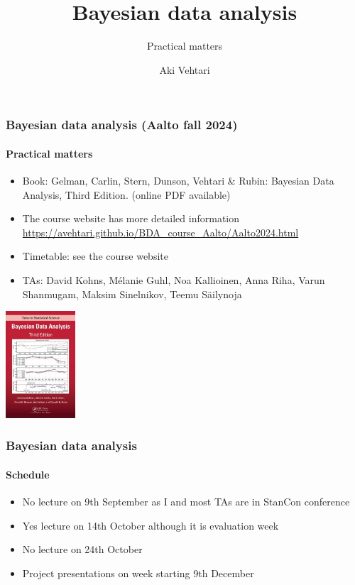 \documentclass[english,t]{beamer}
\title[]{Bayesian data analysis}
\subtitle{Practical matters}
\author{Aki Vehtari}
\institute[Aalto University]{}
\begin{document}
\begin{frame}
  \frametitle{Bayesian data analysis (Aalto fall 2024)}  %
  \framesubtitle{Practical matters}
  
  \begin{itemize}
  \item Book: Gelman, Carlin, Stern, Dunson, Vehtari \& Rubin: Bayesian Data
    Analysis, Third Edition. {\footnotesize (online PDF available)}
  \item The course website has more detailed information\\
    {\small\url{https://avehtari.github.io/BDA_course_Aalto/Aalto2024.html}}
  \item Timetable: see the course website
  \item TAs: David Kohns, Mélanie Guhl, Noa Kallioinen, Anna Riha, Varun Shanmugam, Maksim Sinelnikov, Teemu
    Säilynoja
    \end{itemize}
    \vspace{-0.5\baselineskip}
 \begin{center}
   \includegraphics[width=2.6cm]{figs/BDA3.jpg}
 \end{center}

\end{frame}

\begin{frame}

  \frametitle{Bayesian data analysis}  %
  \framesubtitle{Schedule}

  \begin{itemize}
  \item No lecture on 9th September as I and most TAs are in StanCon conference
  \item Yes lecture on 14th October although it is evaluation week
  \item No lecture on 24th October
  \item Project presentations on week starting 9th December
  \end{itemize}
  
\end{frame}
\end{document}
